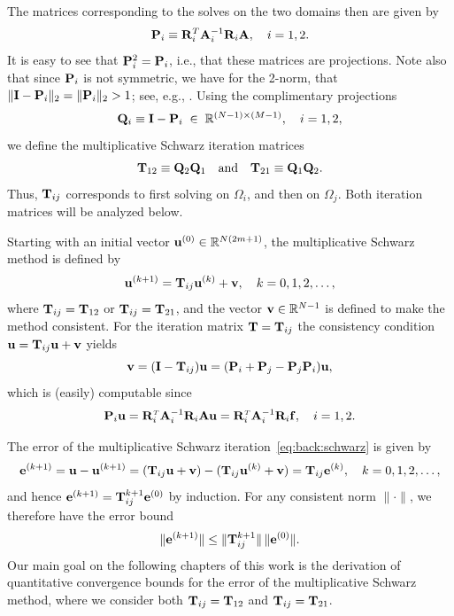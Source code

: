 The matrices corresponding to the solves on the two domains then are given by
%
\begin{equation}\label{eq:back:Pi}
\P_i\equiv \R_i^T\A_i^{-1}\R_i\A,\quad i=1,2.
\end{equation}
%
It is easy to see that $\P_i^2=\P_i$, i.e., that these matrices are projections.
Note also that since $\P_i$ is not symmetric, we have for the 2-norm,
that $\|\I-\P_i\|_2 = \|\P_i\|_2 > 1$; see, e.g., \cite{Szy06}. Using the
complimentary projections
%
$$\Q_i\equiv \I-\P_i\;\in\;\mathbb{R}^{(N-1)\times (M-1)},\quad i=1,2,$$
%
we define the multiplicative Schwarz iteration matrices
%
\begin{equation}\label{eq:back:Tij}
\T_{12}\equiv \Q_2\Q_1\quad\mbox{and}\quad \T_{21}\equiv \Q_1\Q_2.
\end{equation}
%
Thus, $\T_{ij}$ corresponds to first solving on $\Omega_i$, and then on
$\Omega_j$. Both iteration matrices will be analyzed below.

Starting with an initial vector $\u^{(0)}\in{\mathbb R}^{N(2m+ 1)}$,
the multiplicative Schwarz method is defined by
%
\begin{equation}\label{eq:back:schwarz}
\u^{(k+1)}=\T_{ij} \u^{(k)}+\vv, \quad k=0,1,2,\dots,
\end{equation}
%
where $\T_{ij}=\T_{12}$ or $\T_{ij}=\T_{21}$, and the vector
$\vv\in {\mathbb R}^{N-1}$ is defined to make the method consistent.
For the iteration matrix $\T=\T_{ij}$ the consistency condition
$\u=\T_{ij}\u+\vv$ yields
$$
\vv = (\I-\T_{ij})\u = (\P_i+\P_j-\P_j\P_i)\u,
$$
which is (easily) computable since
$$
\P_i\u=\R_i^{\Tr}\A_i^{-1}\R_i\A\u=\R_i^{\Tr}\A_i^{-1}\R_i\f,\quad i=1,2.
$$

The error of the multiplicative Schwarz iteration~\eqref{eq:back:schwarz} is
given by
\begin{equation}\label{eq:back:schwarz_err}
\e^{(k+1)}=\u-\u^{(k+1)}=(\T_{ij}\u + \vv)- (\T_{ij} \u^{(k)}+\vv)=\T_{ij} \e^{(k)},
\quad k=0,1,2,\dots,
\end{equation}
and hence $\e^{(k+1)}=\T_{ij}^{k+1} \e^{(0)}$ by induction.
For any consistent norm $\|\cdot\|$, we therefore have the error bound
%
\begin{equation}\label{eq:back:error}
\|\e^{(k+1)}\|\leq \|\T_{ij}^{k+1}\|\,\|\e^{(0)}\|.
\end{equation}
%
Our main goal on the following chapters of this work is the derivation of
quantitative convergence bounds for the error of the multiplicative Schwarz method, where we consider both
$\T_{ij}=\T_{12}$ and $\T_{ij}=\T_{21}$.

